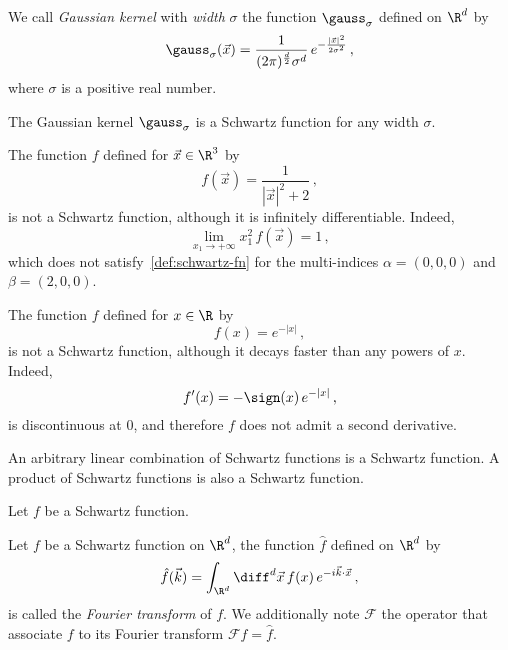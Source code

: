 \begin{definition}
  We call \emph{Gaussian kernel} with \emph{width} $\sigma$ the function $\gauss_{\sigma}$
  defined on $\R^d$ by
  \begin{equation}
    \gauss_{\sigma}(\vec{x})=\frac{1}{(2\pi)^{\frac{d}{2}}\sigma^d}\,e^{-\frac{|\vec{x}|^2}{2\sigma^2}}\,,
  \end{equation}
  where $\sigma$ is a positive real number.
\end{definition}
\begin{proposition}
  The Gaussian kernel $\gauss_{\sigma}$ is a Schwartz function for any width $\sigma$.
\end{proposition}
\begin{example}
  The function $f$ defined for $\vec{x}\in\R^3$ by
  \begin{equation}
    f(\vec{x})=\frac{1}{|\vec{x}|^2+2}\,,
  \end{equation}
  is not a Schwartz function, although it is infinitely differentiable. Indeed,
  \begin{equation}
    \lim_{x_1\to+\infty} x_1^2\,f(\vec{x})=1\,,
  \end{equation}
  which does not satisfy~\cref{def:schwartz-fn} for the multi-indices $\alpha=(0,0,0)$ and
  $\beta=(2,0,0)$.
\end{example}
\begin{example}
  The function $f$ defined for $x\in\R$ by
  \begin{equation}
    f(x)=e^{-|x|}\,,
  \end{equation}
  is not a Schwartz function, although it decays faster than any powers of $x$. Indeed,
  \begin{equation}
    f'(x)=-\sign(x)\,e^{-|x|}\,,
  \end{equation}
  is discontinuous at $0$, and therefore $f$ does not admit a second derivative.
\end{example}
\begin{proposition}
  An arbitrary linear combination of Schwartz functions is a Schwartz function. A product
  of Schwartz functions is also a Schwartz function.
\end{proposition}
\begin{proposition}
  Let $f$ be a Schwartz function.
\end{proposition}
\begin{definition}
  Let $f$ be a Schwartz function on $\R^d$, the function $\hat{f}$ defined on $\R^d$ by
  \begin{equation}
    \hat{f}(\vec{k})=\int_{\R^d}\diff^d\vec{x}\,f(x)\,e^{-i\vec{k}\cdotp\vec{x}}\,,
  \end{equation}
  is called the \emph{Fourier transform} of $f$. We additionally note $\mathcal{F}$ the operator
  that associate $f$ to its Fourier transform $\mathcal{F}f=\hat{f}$.
\end{definition}
\

